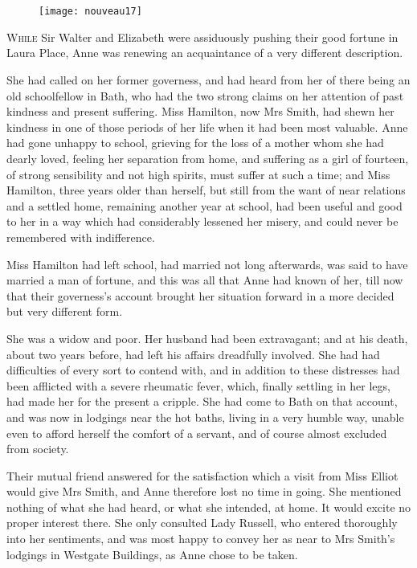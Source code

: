 \chapter[Chapter \thechapter]{}

\begin{figure}[t!]
\centering
\texttt{[image: nouveau17]}
\end{figure}

\lettrine[lines=4,lraise=0.3]{W}{hile} Sir Walter and Elizabeth were assiduously pushing their good fortune in Laura Place, Anne was renewing an acquaintance of a very different description.

She had called on her former governess, and had heard from her of there being an old schoolfellow in Bath, who had the two strong claims on her attention of past kindness and present suffering. Miss Hamilton, now Mrs Smith, had shewn her kindness in one of those periods of her life when it had been most valuable. Anne had gone unhappy to school, grieving for the loss of a mother whom she had dearly loved, feeling her separation from home, and suffering as a girl of fourteen, of strong sensibility and not high spirits, must suffer at such a time; and Miss Hamilton, three years older than herself, but still from the want of near relations and a settled home, remaining another year at school, had been useful and good to her in a way which had considerably lessened her misery, and could never be remembered with indifference.

Miss Hamilton had left school, had married not long afterwards, was said to have married a man of fortune, and this was all that Anne had known of her, till now that their governess's account brought her situation forward in a more decided but very different form.

She was a widow and poor. Her husband had been extravagant; and at his death, about two years before, had left his affairs dreadfully involved. She had had difficulties of every sort to contend with, and in addition to these distresses had been afflicted with a severe rheumatic fever, which, finally settling in her legs, had made her for the present a cripple. She had come to Bath on that account, and was now in lodgings near the hot baths, living in a very humble way, unable even to afford herself the comfort of a servant, and of course almost excluded from society.

Their mutual friend answered for the satisfaction which a visit from Miss Elliot would give Mrs Smith, and Anne therefore lost no time in going. She mentioned nothing of what she had heard, or what she intended, at home. It would excite no proper interest there. She only consulted Lady Russell, who entered thoroughly into her sentiments, and was most happy to convey her as near to Mrs Smith's lodgings in Westgate Buildings, as Anne chose to be taken.

